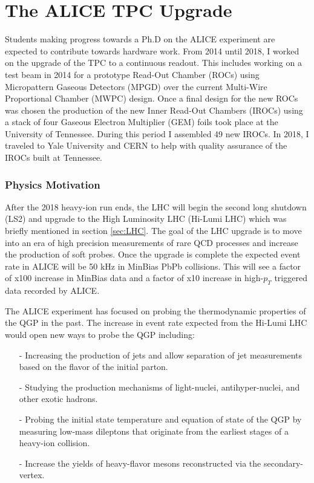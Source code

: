 \chapter{The ALICE TPC Upgrade} \label{ch:tpcu}

Students making progress towards a Ph.D on the ALICE experiment are expected to contribute towards hardware work.  From 2014 until 2018, I worked on the upgrade of the TPC to a continuous readout.  This includes working on a test beam in 2014 for a prototype Read-Out Chamber (ROCs) using Micropattern Gaseous Detectors (MPGD) over the current Multi-Wire Proportional Chamber (MWPC) design.  Once a final design for the new ROCs was chosen the production of the new Inner Read-Out Chambers (IROCs) using a stack of four Gaseous Electron Multiplier (GEM) foils took place at the University of Tennessee.  During this period I assembled 49 new IROCs.  In 2018, I traveled to Yale University and CERN to help with quality assurance of the IROCs built at Tennessee.


\subsection{Physics Motivation}
After the 2018 heavy-ion run ends, the LHC will begin the second long shutdown (LS2) and upgrade to the High Luminosity LHC (Hi-Lumi LHC)\cite{Apollinari:2015bam} which was briefly mentioned in section \ref{sec:LHC}.  The goal of the LHC upgrade is to move into an era of high precision measurements of rare QCD processes and increase the production of soft probes.  Once the upgrade is complete the expected event rate in ALICE will be 50 kHz in MinBias PbPb collisions.  This will see a factor of x100 increase in MinBias data and a factor of x10 increase in high-$p_{T}$ triggered data recorded by ALICE.

The ALICE experiment has focused on probing the thermodynamic properties of the QGP in the past.  The increase in event rate expected from the Hi-Lumi LHC would open new ways to probe the QGP including\cite{Abelev:1475243}:

\begin{itemize}
\item[-] Increasing the production of jets and allow separation of jet measurements based on the flavor of the initial parton.
\item[-] Studying the production mechanisms of light-nuclei, antihyper-nuclei, and other exotic hadrons.
\item[-] Probing the initial state temperature and equation of state of the QGP by measuring low-mass dileptons that originate from the earliest stages of a heavy-ion collision.
\item[-] Increase the yields of heavy-flavor mesons reconstructed via the secondary-vertex. 
\end{itemize}

